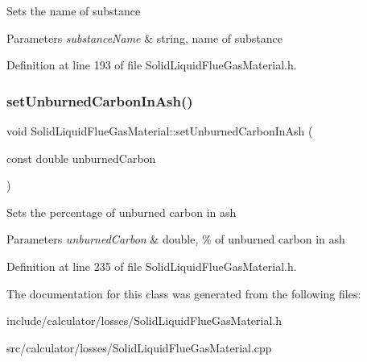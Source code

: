 Sets the name of substance 
\begin{DoxyParams}{Parameters}
{\em substance\+Name} & string, name of substance \\
\hline
\end{DoxyParams}


Definition at line 193 of file Solid\+Liquid\+Flue\+Gas\+Material.\+h.

\mbox{\label{class_solid_liquid_flue_gas_material_adf052dd1bdceeab710a4986b1fd874b9}} 
\subsubsection{\texorpdfstring{set\+Unburned\+Carbon\+In\+Ash()}{setUnburnedCarbonInAsh()}}
{\footnotesize\ttfamily void Solid\+Liquid\+Flue\+Gas\+Material\+::set\+Unburned\+Carbon\+In\+Ash (\begin{DoxyParamCaption}\item[{const double}]{unburned\+Carbon }\end{DoxyParamCaption})\hspace{0.3cm}{\ttfamily [inline]}}

Sets the percentage of unburned carbon in ash 
\begin{DoxyParams}{Parameters}
{\em unburned\+Carbon} & double, \% of unburned carbon in ash \\
\hline
\end{DoxyParams}


Definition at line 235 of file Solid\+Liquid\+Flue\+Gas\+Material.\+h.



The documentation for this class was generated from the following files\+:\begin{DoxyCompactItemize}
\item 
include/calculator/losses/Solid\+Liquid\+Flue\+Gas\+Material.\+h\item 
src/calculator/losses/Solid\+Liquid\+Flue\+Gas\+Material.\+cpp\end{DoxyCompactItemize}
